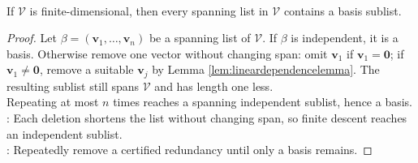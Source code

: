\begin{theorem} \label{thm:reducing-spanning-lists} \\
If $\mathcal{V}$ is finite-dimensional, then every spanning list in $\mathcal{V}$ contains a basis sublist.
\begin{proof}
Let $\beta=(\mathbf{v}_1,\ldots,\mathbf{v}_n)$ be a spanning list of $\mathcal{V}$. If $\beta$ is independent, it is a basis. Otherwise remove one vector without changing span: omit $\mathbf{v}_1$ if $\mathbf{v}_1=\mathbf{0}$; if $\mathbf{v}_1\neq\mathbf{0}$, remove a suitable $\mathbf{v}_j$ by Lemma \ref{lem:lineardependencelemma}. The resulting sublist still spans $\mathcal{V}$ and has length one less.\\
Repeating at most $n$ times reaches a spanning independent sublist, hence a basis.\\
: Each deletion shortens the list without changing span, so finite descent reaches an independent sublist.\\
: Repeatedly remove a certified redundancy until only a basis remains.
\end{proof}
\end{theorem}

